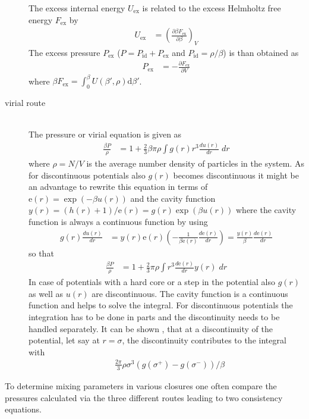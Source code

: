 \begin{description}
The excess internal energy $U_\text{ex}$ is related to the excess Helmholtz free energy
$F_\text{ex}$ by
\begin{align}
U_\text{ex} &= \left(\frac{\partial \beta F_\text{ex}}{\partial \beta}\right)_V
\end{align}
The excess pressure $P_\text{ex}$ ($P=P_\text{id}+P_\text{ex}$ and $P_\text{id}=\rho/\beta$) is than obtained as
\begin{align}
P_\text{ex} &= - \frac{\partial F_\text{ex}}{\partial V}
\end{align}
where $\beta F_\text{ex} = \int_0^\beta U(\beta',\rho) \mathrm{d}\beta'$.
\item [virial route] ~\vphantom{.} \\
The pressure or virial equation is given as
\begin{align} \label{eq:pressure_virial1}
\frac{\beta P}{\rho} &= 1+\frac{2}{3} \beta\pi\rho\int g(r) r^3 \frac{du(r)}{dr} \; dr
\end{align}
where $\rho= N/V$ is the average number density of particles in the system. As for discontinuous
potentials also $g(r)$ becomes discontinuous it might be an advantage to rewrite
this equation in terms of $\mathrm{e}(r) = \exp(-\beta u(r))$ and the cavity
function $y(r) = (h(r)+1)/\mathrm{e}(r) = g(r)\exp(\beta u(r))$ where the cavity function
is always a continuous function by using
\begin{align}
g(r) \frac{du(r)}{dr} &= y(r) \mathrm{e}(r)
             \left(-\frac{1}{\beta \mathrm{e}(r)}\frac{d \mathrm{e}(r)}{dr}\right)
                       = \frac{y(r)}{\beta}\frac{d \mathrm{e}(r)}{dr}
\end{align}
so that
\begin{align} \label{eq:pressure_virial2}
\frac{\beta P}{\rho} &= 1+\frac{2}{3} \pi\rho\int r^3 \frac{d\mathrm{e}(r)}{dr} y(r) \; dr
\end{align}
In case of potentials with a hard core or a step in the potential also $g(r)$ as well as $u(r)$ are discontinuous.
The cavity function is a continuous function and helps to solve the integral.
For discontinuous potentials the integration has to be done in parts and the
discontinuity needs to be handled separately. It can be shown \cite{Smith1977}, that at a
discontinuity of the potential, let say at $r=\sigma$, the discontinuity contributes
to the integral with
\begin{align}
& \frac{2\pi}{3}\rho\sigma^3\left(g(\sigma^+)-g(\sigma^-)\right)/\beta
\end{align}
\end{description}
To determine mixing parameters in various closures one often compare
the pressures calculated via the three different routes leading to
two consistency equations.

